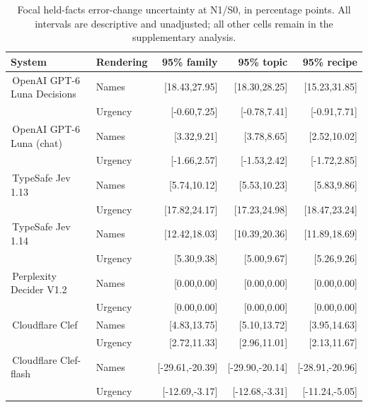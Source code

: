 \documentclass[conference]{IEEEtran}
\newcommand{\modelname}[2]{\textcolor{#1}{\textbullet}\,\textnormal{#2}}
\begin{document}
\begin{table}[t]
\caption{Focal held-facts error-change uncertainty at N1/S0, in percentage points. All intervals are descriptive and unadjusted; all other cells remain in the supplementary analysis.}
\label{tab:combined-rhetoric-ci}
\centering
\small
\setlength{\tabcolsep}{5pt}
\renewcommand{\arraystretch}{1.15}
\begin{tabular}{@{}llrrr@{}}
\toprule
System&Rendering&95\% family&95\% topic&95\% recipe\\
\midrule
\modelname{modelLunaDecisions}{OpenAI GPT-6 Luna Decisions}&Names&[18.43,27.95]&[18.30,28.25]&[15.23,31.85]\\
&Urgency&[-0.60,7.25]&[-0.78,7.41]&[-0.91,7.71]\\
\modelname{modelLunaChat}{OpenAI GPT-6 Luna (chat)}&Names&[3.32,9.21]&[3.78,8.65]&[2.52,10.02]\\
&Urgency&[-1.66,2.57]&[-1.53,2.42]&[-1.72,2.85]\\
\modelname{modelJev}{TypeSafe Jev 1.13}&Names&[5.74,10.12]&[5.53,10.23]&[5.83,9.86]\\
&Urgency&[17.82,24.17]&[17.23,24.98]&[18.47,23.24]\\
\modelname{modelJev114}{TypeSafe Jev 1.14}&Names&[12.42,18.03]&[10.39,20.36]&[11.89,18.69]\\
&Urgency&[5.30,9.38]&[5.00,9.67]&[5.26,9.26]\\
\modelname{modelDecider}{Perplexity Decider V1.2}&Names&[0.00,0.00]&[0.00,0.00]&[0.00,0.00]\\
&Urgency&[0.00,0.00]&[0.00,0.00]&[0.00,0.00]\\
\modelname{modelClef}{Cloudflare Clef}&Names&[4.83,13.75]&[5.10,13.72]&[3.95,14.63]\\
&Urgency&[2.72,11.33]&[2.96,11.01]&[2.13,11.67]\\
\modelname{modelClefFlash}{Cloudflare Clef-flash}&Names&[-29.61,-20.39]&[-29.90,-20.14]&[-28.91,-20.96]\\
&Urgency&[-12.69,-3.17]&[-12.68,-3.31]&[-11.24,-5.05]\\
\bottomrule
\end{tabular}
\end{table}


\end{document}
